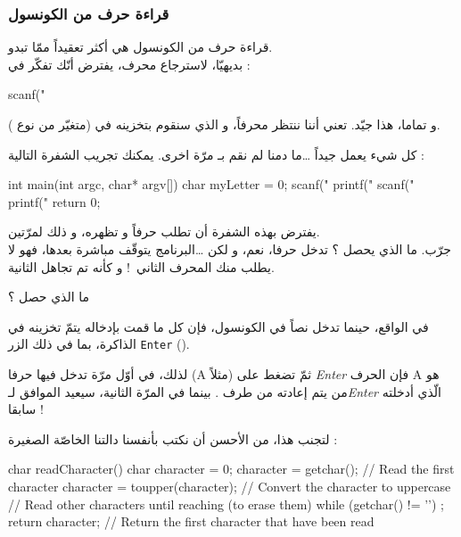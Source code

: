 \subsubsection{قراءة حرف من الكونسول}
قراءة حرف من الكونسول هي أكثر تعقيداً ممّا تبدو.\\
بديهيّا، لاسترجاع محرف، يفترض أنّك تفكّر في :

\begin{Csource}
scanf("%
\end{Csource}

و تماما، هذا جيّد.
تعني أننا ننتظر محرفاً، و الذي سنقوم بتخزينه في
(متغيّر من نوع
).


كل شيء يعمل جيداً \dots ما دمنا لم نقم بـ
مرّة اخرى. يمكنك تجريب الشفرة التالية :

\begin{Csource}
int main(int argc, char* argv[])
{
 	char myLetter = 0;
 	scanf("%
 	printf("%
 	scanf("%
 	printf("%
 	return 0;
}
\end{Csource}

يفترض بهذه الشفرة أن تطلب حرفاً و تظهره، و ذلك لمرّتين.\\
جرّب. ما الذي يحصل ؟ تدخل حرفا، نعم، و لكن \dots البرنامج يتوقّف مباشرة بعدها، فهو لا يطلب منك المحرف الثاني~! و كأنه تم تجاهل
الثانية.

\begin{question}
ما الذي حصل ؟
\end{question}

في الواقع، حينما تدخل نصاً في الكونسول، فإن كل ما قمت بإدخاله يتمّ تخزينه في الذاكرة، بما في ذلك الزر
\texttt{Enter}
().

لذلك، في أوّل مرّة تدخل فيها حرفا
(\textenglish{A}
مثلاً) ثمّ تضغط على
\textit{\textenglish{Enter}}
فإن الحرف
\textenglish{A}
هو من يتم إعادته من طرف
.
بينما في المرّة الثانية،
سيعيد
الموافق لـ\textit{\textenglish{Enter}}
الّذي أدخلته سابقا !

لتجنب هذا، من الأحسن أن نكتب بأنفسنا دالتنا الخاصّة الصغيرة
 :

\begin{Csource}
char readCharacter()
{
  char character = 0;
  character = getchar(); // Read the first character
  character = toupper(character); // Convert the character to uppercase
  // Read other characters until reaching \n (to erase them)
  while (getchar() != '\n') ;
  return character; // Return the first character that have been read
}
\end{Csource}

